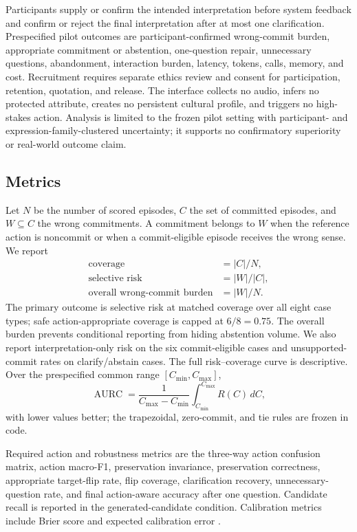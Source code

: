 \documentclass[preprint,12pt,authoryear]{elsarticle}
\begin{document}
Participants supply or confirm the intended interpretation before system
feedback and confirm or reject the final interpretation after at most one
clarification. Prespecified pilot outcomes are participant-confirmed
wrong-commit burden, appropriate commitment or abstention, one-question repair,
unnecessary questions, abandonment, interaction burden, latency, tokens,
calls, memory, and cost. Recruitment requires separate ethics review and
consent for participation, retention, quotation, and release. The interface
collects no audio, infers no protected attribute, creates no persistent
cultural profile, and triggers no high-stakes action. Analysis is limited to
the frozen pilot setting with participant- and expression-family-clustered
uncertainty; it supports no confirmatory superiority or real-world outcome
claim.

\subsection{Metrics}

Let $N$ be the number of scored episodes, $C$ the set of committed episodes,
and $W\subseteq C$ the wrong commitments. A commitment belongs to $W$ when
the reference action is noncommit or when a commit-eligible episode receives
the wrong sense. We report
\begin{align}
\text{coverage} &= |C|/N,\\
\text{selective risk} &= |W|/|C|,\\
\text{overall wrong-commit burden} &= |W|/N.
\end{align}
The primary outcome is selective risk at matched coverage over all eight case
types; safe action-appropriate coverage is capped at $6/8=0.75$. The overall burden
prevents conditional reporting from hiding abstention volume. We also report
interpretation-only risk on the six commit-eligible cases and unsupported-
commit rates on clarify/abstain cases. The full risk--coverage curve is
descriptive. Over the prespecified common range $[C_{\min},C_{\max}]$,
\begin{equation}
\operatorname{AURC}=\frac{1}{C_{\max}-C_{\min}}
\int_{C_{\min}}^{C_{\max}}R(C)\,dC,
\end{equation}
with lower values better; the trapezoidal, zero-commit, and tie rules are
frozen in code.

Required action and robustness metrics are the three-way action confusion
matrix, action macro-F1, preservation invariance, preservation correctness,
appropriate target-flip rate, flip coverage, clarification recovery,
unnecessary-question rate, and final action-aware accuracy after one question.
Candidate recall is reported in the generated-candidate condition. Calibration
metrics include Brier score and expected calibration error
\citep{brier1950verification,guo2017calibration}.
\end{document}
